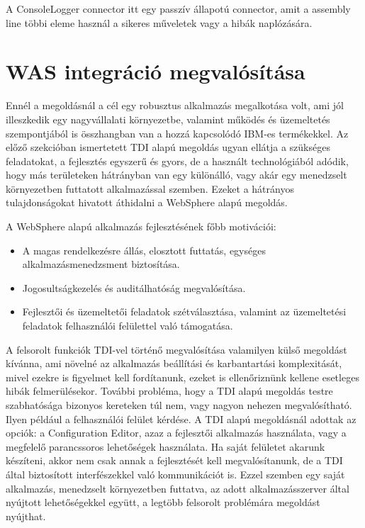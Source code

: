 A ConsoleLogger connector itt egy passzív állapotú connector, amit a assembly line többi eleme használ a sikeres műveletek vagy a hibák naplózására.

\section{WAS integráció megvalósítása}

Ennél a megoldásnál a cél egy robusztus alkalmazás megalkotása volt, ami jól illeszkedik egy nagyvállalati környezetbe, valamint működés és üzemeltetés szempontjából is összhangban van a hozzá kapcsolódó IBM-es termékekkel. Az előző szekcióban ismertetett TDI alapú megoldás ugyan ellátja a szükséges feladatokat, a fejlesztés egyszerű és gyors, de a használt technológiából adódik, hogy más területeken hátrányban van egy különálló, vagy akár egy menedzselt környezetben futtatott alkalmazással szemben. Ezeket a hátrányos tulajdonságokat hivatott áthidalni a WebSphere alapú megoldás.

A WebSphere alapú alkalmazás fejlesztésének főbb motivációi:
\begin{itemize}	
	\item A magas rendelkezésre állás, elosztott futtatás, egységes alkalmazásmenedzsment biztosítása.	
	
	\item Jogosultságkezelés és auditálhatóság megvalósítása. 
	
	\item Fejlesztői és üzemeltetői feladatok szétválasztása, valamint az üzemeltetési feladatok felhasználói felülettel való támogatása.
\end{itemize}

A felsorolt funkciók TDI-vel történő megvalósítása valamilyen külső megoldást kívánna, ami növelné az alkalmazás beállítási és karbantartási komplexitását, mivel ezekre is figyelmet kell fordítanunk, ezeket is ellenőriznünk kellene esetleges hibák felmerülésekor. További probléma, hogy a TDI alapú megoldás testre szabhatósága bizonyos kereteken túl nem, vagy nagyon nehezen megvalósítható. Ilyen például a felhasználói felület kérdése. A TDI alapú megoldásnál adottak az opciók: a Configuration Editor, azaz a fejlesztői alkalmazás használata, vagy a megfelelő parancssoros lehetőségek használata. Ha saját felületet akarunk készíteni, akkor nem csak annak a fejlesztését kell megvalósítanunk, de a TDI által biztosított interfészekkel való kommunikációt is. Ezzel szemben egy saját alkalmazás, menedzselt környezetben futtatva, az adott alkalmazásszerver által nyújtott lehetőségekkel együtt, a legtöbb felsorolt problémára megoldást nyújthat. 


